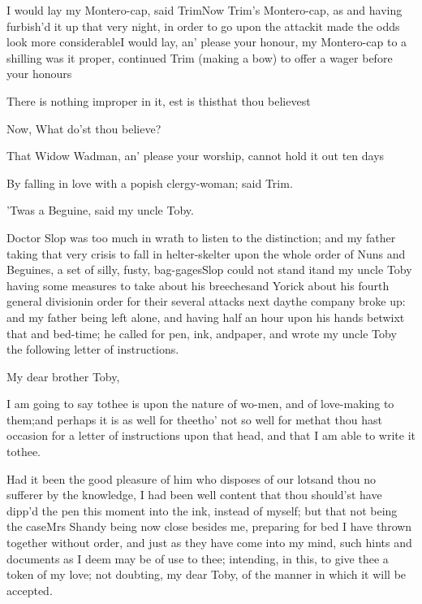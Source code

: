 \documentclass{article}
\begin{document}
I would lay my Montero-cap, said
Trim\tsh Now Trim’s
Montero-cap, as\break
{}
and having furbish’d it up that very night, in
order to go upon the attack\tsk it made the odds look more
considerable\break\null\tsh I would lay, an’ please your
honour, my Montero-cap to a shilling\tsk {} was it proper,
continued Trim (making a bow) to offer a wager before your
honours\tsh

\tsk There is nothing improper in it,
est is this\tsk that thou believest\tsh

\tsh Now, What do’st thou believe?

That Widow Wadman, an’ please your worship, cannot
hold it out ten days\tsh

\noindent
{}

By falling in love with a popish clergy-woman; said
Trim.

’Twas a Beguine, said my uncle Toby.

Doctor Slop was too much in wrath to listen to the
distinction; and my father taking that very crisis to fall in
helter-skelter upon the whole order of Nuns and Beguines, a
set of silly, fusty, bag-\break gages\tsh Slop could not stand
it\tsh\break and my uncle Toby having some measures to take
about his breeches\tsk and Yorick about his fourth general
division\break\tsk in order for their several attacks next
day\tsk the company broke up: and my father being left alone, and
having half an hour upon his hands betwixt that and bed-time; he
called for pen, ink, and\break paper, and wrote my uncle Toby the
following letter of instructions.

\vfill {}\eject
\setlength{\baselineskip}{13.36pt} %
My dear brother Toby,

\vskip -6pt

 I am going to say to\break thee is
upon the nature of wo-\break men, and of
love-making to them;\break and perhaps
it is as well for thee\tsk tho’ not so well for
me\tsk that thou hast occasion for a letter of instructions upon
that head, and that I am able to write it to\break thee.

Had it been the good pleasure of him who disposes of our
lots\tsk and thou no sufferer by the knowledge, I had been well content that thou should’st have
dipp’d the pen this moment into the ink, instead of myself;
but that not being the case\tsh\tsk Mrs Shandy
being now close besides me, preparing for bed\tsh{}
I have thrown together without order, and just as they have come into my mind, such
hints and documents as I deem may be of use to thee; intending, in this, to give
thee a token of my love; not doubting, my dear Toby, of the manner in which it will
be accepted.
\end{document}
